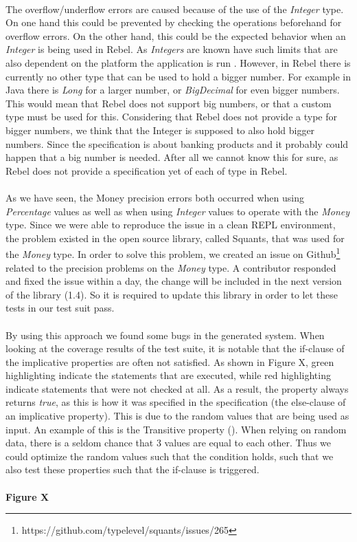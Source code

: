 \\
The overflow/underflow errors are caused because of the use of the \textit{Integer} type. On one hand this could be prevented by checking the operations beforehand for overflow errors. On the other hand, this could be the expected behavior when an \textit{Integer} is being used in Rebel. As \textit{Integers} are known have such limits that are also dependent on the platform the application is run . However, in Rebel there is currently no other type that can be used to hold a bigger number. For example in Java there is \textit{Long} for a larger number, or \textit{BigDecimal} for even bigger numbers. This would mean that Rebel does not support big numbers, or that a custom type must be used for this. Considering that Rebel does not provide a type for bigger numbers, we think that the Integer is supposed to also hold bigger numbers. Since the specification is about banking products and it probably could happen that a big number is needed. After all we cannot know this for sure, as Rebel does not provide a specification yet of each of type in Rebel.\\
\\
As we have seen, the Money precision errors both occurred when using \textit{Percentage} values as well as when using \textit{Integer} values to operate with the \textit{Money} type. Since we were able to reproduce the issue in a clean REPL environment, the problem existed in the open source library, called Squants, that was used for the \textit{Money} type. In order to solve this problem, we created an issue on Github\footnote{https://github.com/typelevel/squants/issues/265} related to the precision problems on the \textit{Money} type. A contributor responded and fixed the issue within a day, the change will be included in the next version of the library (1.4). So it is required to update this library in order to let these tests in our test suit pass.\\
\\
By using this approach we found some bugs in the generated system. When looking at the coverage results of the test suite, it is notable that the if-clause of the implicative properties are often not satisfied. As shown in Figure X, green highlighting indicate the statements that are executed, while red highlighting indicate statements that were not checked at all. As a result, the property always returns \textit{true}, as this is how it was specified in the specification (the else-clause of an implicative property). This is due to the random values that are being used as input. An example of this is the Transitive property (). When relying on random data, there is a seldom chance that 3 values are equal to each other. Thus we could optimize the random values such that the condition holds, such that we also test these properties such that the if-clause is triggered.\\
\\
\textbf{Figure X}

